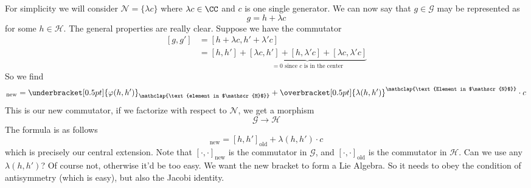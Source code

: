 For simplicity we will consider $\mathscr{N}=\{\lambda c\}$ where
$\lambda c\in\CC$ and $c$ is one single generator. We can now say
that $g\in\mathscr{G}$ may be represented as
\begin{equation}
g = h + \lambda c
\end{equation}
for some $h\in\mathscr{H}$. The general properties are really
clear. Suppose we have the commutator 
\begin{subequations}
\begin{align}
[g,g'] &= [h+\lambda c, h'+\lambda'c]\\
&= [h,h'] + \underbrace{[\lambda c, h']+[h,\lambda' c] + [\lambda
    c,\lambda'c]}_{=0\text{ since $c$ is in the center}}
\end{align}
\end{subequations}
So we find
\begin{equation}
[h,h']_{\text{new}} =
\underbracket[0.5pt]{\varphi(h,h')}_{\mathclap{\text{element in
    $\mathscr{H}$}}} +
\overbracket[0.5pt]{\lambda(h,h')}^{\mathclap{\text{Element in $\mathscr{N}$}}}\cdot c
\end{equation}
This is our new commutator, if we factorize with respect to
$\mathscr{N}$, we get a morphism
\begin{equation}
\mathscr{G}\to\mathscr{H}
\end{equation}
The formula is as follows
\begin{equation}
[h,h']_{\text{new}} = [h,h']_{\text{old}} + \lambda(h,h')\cdot c
\end{equation}
which is precisely our central extension. Note that
$[\cdot,\cdot]_{\text{new}}$ is the commutator in $\mathscr{G}$,
and $[\cdot,\cdot]_{\text{old}}$ is the commutator in $\mathscr{H}$.
Can we use any $\lambda(h,h')$? Of course not, otherwise it'd be
too easy. We want the new bracket to form a Lie Algebra. So it
needs to obey the condition of antisymmetry (which is easy), but
also the Jacobi identity.


